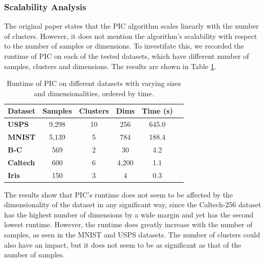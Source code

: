 \subsubsection{Scalability Analysis}

The original paper states that the PIC algorithm scales linearly with the number of clusters. However, it does not mention the algorithm's scalability with respect to the number of samples or dimensions. To investifate this, we recorded the runtime of PIC on each of the tested datasets, which have different number of samples, clusters and dimensions. The results are shown in Table \ref{table:time}.

\begin{table}[h]
    \centering
    \begin{tabular}{|l|c|c|c|c|c|}
    \hline
    \textbf{Dataset} & \textbf{Samples} & \textbf{Clusters} & \textbf{Dims} & \textbf{Time (s)} \\
    \hline
    \textbf{USPS} & 9,298 & 10 & 256 & 645.0 \\ \hline
    \textbf{MNIST} & 5,139 & 5 & 784 & 188.4 \\ \hline
    \textbf{B-C} & 569 & 2 & 30 & 4.2 \\ \hline
    \textbf{Caltech} & 600 & 6 & 4,200 & 1.1 \\ \hline
    \textbf{Iris} & 150 & 3 & 4 & 0.3 \\ \hline
    \end{tabular}
    \caption{Runtime of PIC on different datasets with varying sizes and dimensionalities, ordered by time.}
    \label{table:time}
\end{table}

The results show that PIC's runtime does not seem to be affected by the dimensionality of the dataset in any significant way, since the Caltech-256 dataset has the highest number of dimensions by a wide margin and yet has the second lowest runtime. However, the runtime does greatly increase with the number of samples, as seen in the MNIST and USPS datasets. The number of clusters could also have an impact, but it does not seem to be as significant as that of the number of samples.
